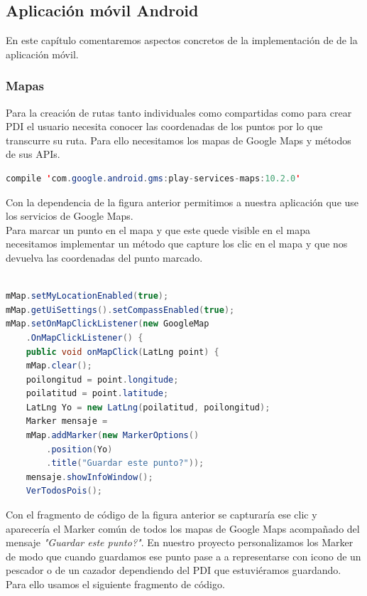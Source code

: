 \newpage

 
 
 
 
 \subsection{Aplicación móvil Android}
En este capítulo comentaremos aspectos concretos de la implementación de de la aplicación móvil.



\subsubsection{Mapas}

 Para la creación de rutas tanto individuales como compartidas como para crear PDI el usuario necesita conocer las coordenadas de los puntos por lo que transcurre su ruta. Para ello necesitamos los mapas de Google Maps y métodos de sus APIs.
 
 
 \begin{lstlisting}[language=java,caption={Dependencia de Google Maps},label=DescriptiveLabel]
compile 'com.google.android.gms:play-services-maps:10.2.0'

\end{lstlisting}
 
 Con la dependencia de la figura anterior permitimos a nuestra aplicación que use los servicios de  Google Maps.\\
 Para marcar un punto en el mapa y que este quede visible en el mapa necesitamos implementar un método que capture los clic en el mapa y que nos devuelva las coordenadas del punto marcado.
 
 
 \begin{lstlisting}[language=java,caption={Captura de clic en la pantalla},label=DescriptiveLabel]
    
mMap.setMyLocationEnabled(true);
mMap.getUiSettings().setCompassEnabled(true);
mMap.setOnMapClickListener(new GoogleMap
	.OnMapClickListener() {
	public void onMapClick(LatLng point) {
	mMap.clear();
	poilongitud = point.longitude;
	poilatitud = point.latitude;
	LatLng Yo = new LatLng(poilatitud, poilongitud);
	Marker mensaje = 
	mMap.addMarker(new MarkerOptions()
		.position(Yo)
		.title("Guardar este punto?"));
  	mensaje.showInfoWindow();
	VerTodosPois();

\end{lstlisting} 
 
 
 
 
  Con el fragmento de código de la figura anterior  se capturaría ese clic y aparecería el Marker común de todos los mapas de Google Maps acompañado del mensaje \textit{"Guardar este punto?"}. En nuestro proyecto personalizamos los Marker de modo que cuando guardamos ese punto pase a a representarse con icono de un pescador o de un cazador dependiendo del PDI que estuviéramos guardando. Para ello usamos el siguiente fragmento de código.

